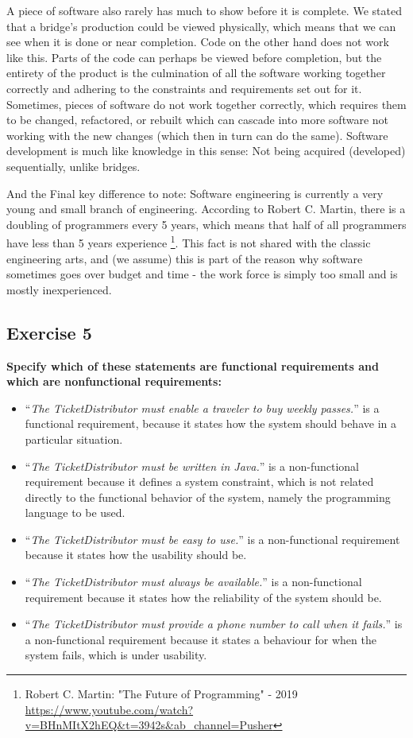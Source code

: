 \documentclass{article}
\begin{document}
A piece of software also rarely has much to show before it is complete. We stated that a bridge's production could be viewed physically, which means that we can see when it is done or near completion. Code on the other hand does not work like this. Parts of the code can perhaps be viewed before completion, but the entirety of the product is the culmination of all the software working together correctly and adhering to the constraints and requirements set out for it. Sometimes, pieces of software do not work together correctly, which requires them to be changed, refactored, or rebuilt which can cascade into more software not working with the new changes (which then in turn can do the same). Software development is much like knowledge in this sense: Not being acquired (developed) sequentially, unlike bridges.

And the Final key difference to note: Software engineering is currently a very young and small branch of engineering. According to Robert C. Martin, there is a doubling of programmers every 5 years, which means that half of all programmers have less than 5 years experience \footnote{Robert C. Martin: "The Future of Programming" - 2019 \url{https://www.youtube.com/watch?v=BHnMItX2hEQ&t=3942s&ab_channel=Pusher}}. This fact is not shared with the classic engineering arts, and (we assume) this is part of the reason why software sometimes goes over budget and time - the work force is simply too small and is mostly inexperienced.


\subsection*{Exercise 5}
\textbf{Specify which of these statements are functional requirements and which are nonfunctional requirements:}
\begin{itemize}
    \item “\textit{The TicketDistributor must enable a traveler to buy weekly passes.}” is a functional requirement, because it states how the system should behave in a particular situation. 
    
    \item “\textit{The TicketDistributor must be written in Java.}” is a non-functional requirement because it defines a system constraint, which is not related directly to the functional behavior of the system, namely the programming language to be used.
    
    \item “\textit{The TicketDistributor must be easy to use.}” is a non-functional requirement because it states how the usability should be.
    
    \item “\textit{The TicketDistributor must always be available.}” is a non-functional requirement because it states how the reliability of the system should be.
    
    \item “\textit{The TicketDistributor must provide a phone number to call when it fails.}” is a non-functional requirement because it states a behaviour for when the system fails, which is under usability.
\end{itemize}
\end{document}
